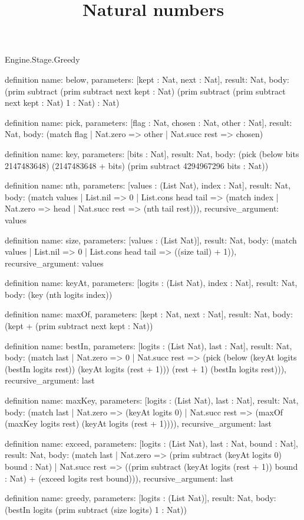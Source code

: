 \begin{lexlean}{Engine.Stage.Greedy}
\title{Natural numbers}
\begin{semanticmodule}
definition{
  name: below,
  parameters: [kept : Nat, next : Nat],
  result: Nat,
  body: (prim subtract (prim subtract next kept : Nat) (prim subtract (prim subtract next kept : Nat) 1 : Nat) : Nat)
}

definition{
  name: pick,
  parameters: [flag : Nat, chosen : Nat, other : Nat],
  result: Nat,
  body: (match flag | Nat.zero => other | Nat.succ rest => chosen)
}

definition{
  name: key,
  parameters: [bits : Nat],
  result: Nat,
  body: (pick (below bits 2147483648) (2147483648 + bits) (prim subtract 4294967296 bits : Nat))
}

definition{
  name: nth,
  parameters: [values : (List Nat), index : Nat],
  result: Nat,
  body: (match values
    | List.nil => 0
    | List.cons head tail => (match index | Nat.zero => head | Nat.succ rest => (nth tail rest))),
  recursive_argument: values
}

definition{
  name: size,
  parameters: [values : (List Nat)],
  result: Nat,
  body: (match values | List.nil => 0 | List.cons head tail => ((size tail) + 1)),
  recursive_argument: values
}

definition{
  name: keyAt,
  parameters: [logits : (List Nat), index : Nat],
  result: Nat,
  body: (key (nth logits index))
}

definition{
  name: maxOf,
  parameters: [kept : Nat, next : Nat],
  result: Nat,
  body: (kept + (prim subtract next kept : Nat))
}

definition{
  name: bestIn,
  parameters: [logits : (List Nat), last : Nat],
  result: Nat,
  body: (match last
    | Nat.zero => 0
    | Nat.succ rest => (pick (below (keyAt logits (bestIn logits rest)) (keyAt logits (rest + 1))) (rest + 1) (bestIn logits rest))),
  recursive_argument: last
}

definition{
  name: maxKey,
  parameters: [logits : (List Nat), last : Nat],
  result: Nat,
  body: (match last
    | Nat.zero => (keyAt logits 0)
    | Nat.succ rest => (maxOf (maxKey logits rest) (keyAt logits (rest + 1)))),
  recursive_argument: last
}

definition{
  name: exceed,
  parameters: [logits : (List Nat), last : Nat, bound : Nat],
  result: Nat,
  body: (match last
    | Nat.zero => (prim subtract (keyAt logits 0) bound : Nat)
    | Nat.succ rest => ((prim subtract (keyAt logits (rest + 1)) bound : Nat) + (exceed logits rest bound))),
  recursive_argument: last
}

definition{
  name: greedy,
  parameters: [logits : (List Nat)],
  result: Nat,
  body: (bestIn logits (prim subtract (size logits) 1 : Nat))
}
\end{semanticmodule}
\end{lexlean}

